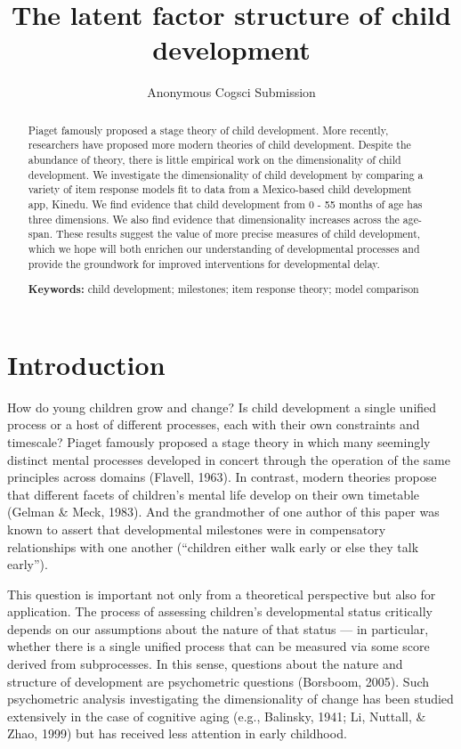 \documentclass[10pt, letterpaper]{article}
\title{The latent factor structure of child development}
\author{Anonymous Cogsci Submission}
\begin{document}
\maketitle

\begin{abstract}
Piaget famously proposed a stage theory of child development. More
recently, researchers have proposed more modern theories of child
development. Despite the abundance of theory, there is little empirical
work on the dimensionality of child development. We investigate the
dimensionality of child development by comparing a variety of item
response models fit to data from a Mexico-based child development app,
Kinedu. We find evidence that child development from 0 - 55 months of
age has three dimensions. We also find evidence that dimensionality
increases across the age-span. These results suggest the value of more
precise measures of child development, which we hope will both enrichen
our understanding of developmental processes and provide the groundwork
for improved interventions for developmental delay.

\textbf{Keywords:}
child development; milestones; item response theory; model comparison
\end{abstract}

\hypertarget{introduction}{%
\section{Introduction}\label{introduction}}

How do young children grow and change? Is child development a single
unified process or a host of different processes, each with their own
constraints and timescale? Piaget famously proposed a stage theory in
which many seemingly distinct mental processes developed in concert
through the operation of the same principles across domains (Flavell,
1963). In contrast, modern theories propose that different facets of
children's mental life develop on their own timetable (Gelman \& Meck,
1983). And the grandmother of one author of this paper was known to
assert that developmental milestones were in compensatory relationships
with one another (``children either walk early or else they talk
early'').

This question is important not only from a theoretical perspective but
also for application. The process of assessing children's developmental
status critically depends on our assumptions about the nature of that
status --- in particular, whether there is a single unified process that
can be measured via some score derived from subprocesses. In this sense,
questions about the nature and structure of development are psychometric
questions (Borsboom, 2005). Such psychometric analysis investigating the
dimensionality of change has been studied extensively in the case of
cognitive aging (e.g., Balinsky, 1941; Li, Nuttall, \& Zhao, 1999) but
has received less attention in early childhood.
\end{document}
